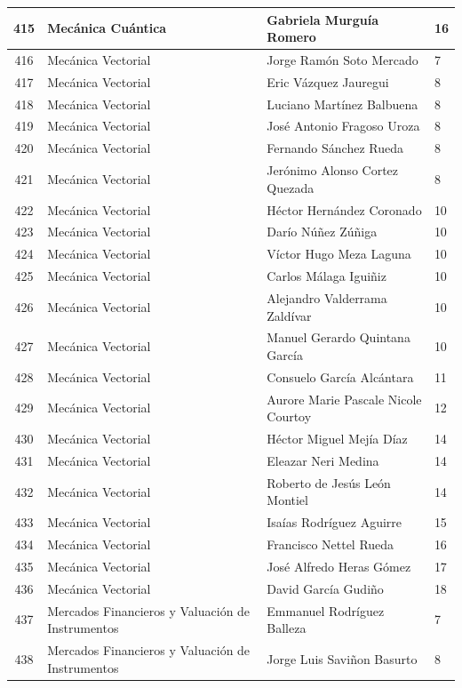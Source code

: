 {\begin{longtable}{|c|p{6.5cm}|p{5cm}|p{1.5cm}|}
  415 & Mecánica Cuántica & Gabriela Murguía Romero & 16 \\ \hline
  416 & Mecánica Vectorial & Jorge Ramón Soto Mercado & 7 \\ \hline
  417 & Mecánica Vectorial & Eric Vázquez Jauregui & 8 \\ \hline
  418 & Mecánica Vectorial & Luciano Martínez Balbuena & 8 \\ \hline
  419 & Mecánica Vectorial & José Antonio Fragoso Uroza & 8 \\ \hline
  420 & Mecánica Vectorial & Fernando Sánchez Rueda & 8 \\ \hline
  421 & Mecánica Vectorial & Jerónimo Alonso Cortez Quezada & 8 \\ \hline
  422 & Mecánica Vectorial & Héctor Hernández Coronado & 10 \\ \hline
  423 & Mecánica Vectorial & Darío Núñez Zúñiga & 10 \\ \hline
  424 & Mecánica Vectorial & Víctor Hugo Meza Laguna & 10 \\ \hline
  425 & Mecánica Vectorial & Carlos Málaga Iguiñiz & 10 \\ \hline
  426 & Mecánica Vectorial & Alejandro Valderrama Zaldívar & 10 \\ \hline
  427 & Mecánica Vectorial & Manuel Gerardo Quintana García & 10 \\ \hline
  428 & Mecánica Vectorial & Consuelo García Alcántara & 11 \\ \hline
  429 & Mecánica Vectorial & Aurore Marie Pascale Nicole Courtoy & 12 \\ \hline
  430 & Mecánica Vectorial & Héctor Miguel Mejía Díaz & 14 \\ \hline
  431 & Mecánica Vectorial & Eleazar Neri Medina & 14 \\ \hline
  432 & Mecánica Vectorial & Roberto de Jesús León Montiel & 14 \\ \hline
  433 & Mecánica Vectorial & Isaías Rodríguez Aguirre & 15 \\ \hline
  434 & Mecánica Vectorial & Francisco Nettel Rueda & 16 \\ \hline
  435 & Mecánica Vectorial & José Alfredo Heras Gómez & 17 \\ \hline
  436 & Mecánica Vectorial & David García Gudiño & 18 \\ \hline
  437 & Mercados Financieros y Valuación de Instrumentos & Emmanuel Rodríguez Balleza & 7 \\ \hline
  438 & Mercados Financieros y Valuación de Instrumentos & Jorge Luis Saviñon Basurto & 8 \\ \hline

\end{longtable}}
